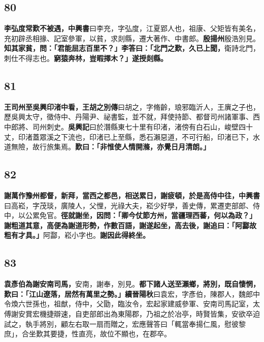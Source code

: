 \subsection*{80}

\textbf{李弘度常歎不被遇，}{\footnotesize \textbf{中興書}曰李充，字弘度，江夏郢人也，祖康、父矩皆有美名，充初辟丞相掾、記室參軍，以貧，求剡縣，遷大著作、中書郎。}\textbf{殷揚州}{\footnotesize 殷浩別見。}\textbf{知其家貧，問：「君能屈志百里不？」李答曰：「北門之歎，久已上聞，}{\footnotesize 衛詩北門，刺仕不得志也。}\textbf{窮猿奔林，豈暇擇木？」遂授剡縣。}

\subsection*{81}

\textbf{王司州至吳興印渚中看，}{\footnotesize \textbf{王胡之別傳}曰胡之，字脩齡，琅邪臨沂人，王廙之子也，歷吳興太守，徵侍中、丹陽尹、祕書監，並不就，拜使持節、都督司州諸軍事、西中郎將、司州刺史。\textbf{吳興記}曰於潛縣東七十里有印渚，渚傍有白石山，峻壁四十丈，印渚蓋眾溪之下流也，印渚已上至縣，悉石瀨惡道，不可行船，印渚已下，水道無險，故行旅集焉。}\textbf{歎曰：「非惟使人情開滌，亦覺日月清朗。」}

\subsection*{82}

\textbf{謝萬作豫州都督，新拜，當西之都邑，相送累日，謝疲頓，於是高侍中往，}{\footnotesize \textbf{中興書}曰高崧，字茂琰，廣陵人，父悝，光祿大夫，崧少好學，善史傳，累遷吏部郎、侍中，以公累免官。}\textbf{徑就謝坐，因問：「卿今仗節方州，當疆理西蕃，何以為政？」謝粗道其意，高便為謝道形勢，作數百語，謝遂起坐，高去後，謝追曰：「阿酃故粗有才具。」}{\footnotesize 阿酃，崧小字也。}\textbf{謝因此得終坐。}

\subsection*{83}

\textbf{袁彥伯為謝安南司馬，}{\footnotesize 安南，謝奉，別見。}\textbf{都下諸人送至瀨鄉，將別，既自悽惘，歎曰：「江山遼落，居然有萬里之勢。」}{\footnotesize \textbf{續晉陽秋}曰袁宏，字彥伯，陳郡人，魏郎中令煥六世孫也，祖猷，侍中，父勖，臨汝令，宏起家建威參軍、安南司馬記室，太傅謝安賞宏機捷辯速，自吏部郎出為東陽郡，乃祖之於冶亭，時賢皆集，安欲卒迫試之，執手將別，顧左右取一扇而贈之，宏應聲答曰「輒當奉揚仁風，慰彼黎庶」，合坐歎其要捷，性直亮，故位不顯也，在郡卒。}

